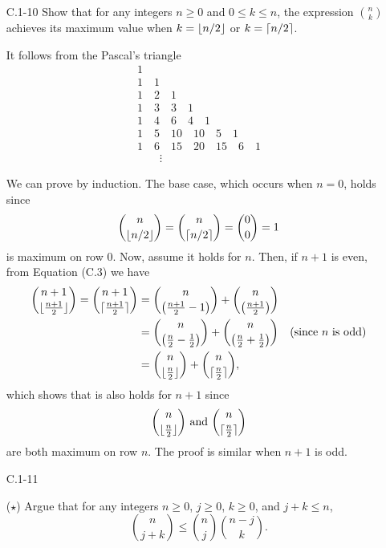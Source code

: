 \begin{enumerate}
\newpage

\item[C.1{-}10] {Show that for any integers $n \ge 0$ and $0 \le k \le n$, the
expression $\binom{n}{k}$ achieves its maximum value when $k = \lfloor n/2\rfloor$ or
$k = \lceil n/2\rceil$.}

\begin{framed}
It follows from the Pascal's triangle
\begin{gather*}
  1\\
  1 \quad 1\\
  1 \quad 2 \quad 1\\
  1 \quad 3 \quad 3 \quad 1\\
  1 \quad 4 \quad 6 \quad 4 \quad 1\\
  1 \quad 5 \quad 10 \quad 10 \quad 5 \quad 1\\
  1 \quad 6 \quad 15 \quad 20 \quad 15 \quad 6 \quad 1\\
  \quad \quad \vdots \quad \quad
\end{gather*}

We can prove by induction. The base case, which occurs when $n = 0$,
holds since
\[
  \binom{n}{\lfloor n/2\rfloor} = \binom{n}{\lceil n/2\rceil} = \binom{0}{0} = 1
\]
is maximum on row 0.  Now, assume it holds for $n$. Then, if $n + 1$ is even,
from Equation (C.3) we have
\begin{equation*}
\begin{aligned}
  \binom{n + 1}{\lfloor\frac{n + 1}{2}\rfloor} = \binom{n + 1}{\lceil\frac{n + 1}{2}\rceil}
  &= \binom{n}{\left(\frac{n + 1}{2} - 1\right)} + \binom{n}{\left(\frac{n + 1}{2}\right)}\\
  &= \binom{n}{\left(\frac{n}{2} - \frac{1}{2}\right)} + \binom{n}{\left(\frac{n}{2} + \frac{1}{2}\right)} & \text{(since $n$ is odd)}\\
  &= \binom{n}{\lfloor\frac{n}{2}\rfloor} + \binom{n}{\lceil\frac{n}{2}\rceil},
\end{aligned}
\end{equation*}
which shows that is also holds for $n + 1$ since
\[
  \binom{n}{\lfloor\frac{n}{2}\rfloor} \text{ and } \binom{n}{\lceil\frac{n}{2}\rceil}
\]
are both maximum on row $n$. The proof is similar when $n + 1$ is odd.
\end{framed}

\newpage

\item[C.1{-}11] {($\star$) Argue that for any integers $n \ge 0$, $j \ge 0$,
$k \ge 0$, and $j + k \le n$,
\[
  \binom{n}{j + k} \le \binom{n}{j} \binom{n - j}{k}.
\]

}
\end{enumerate}
